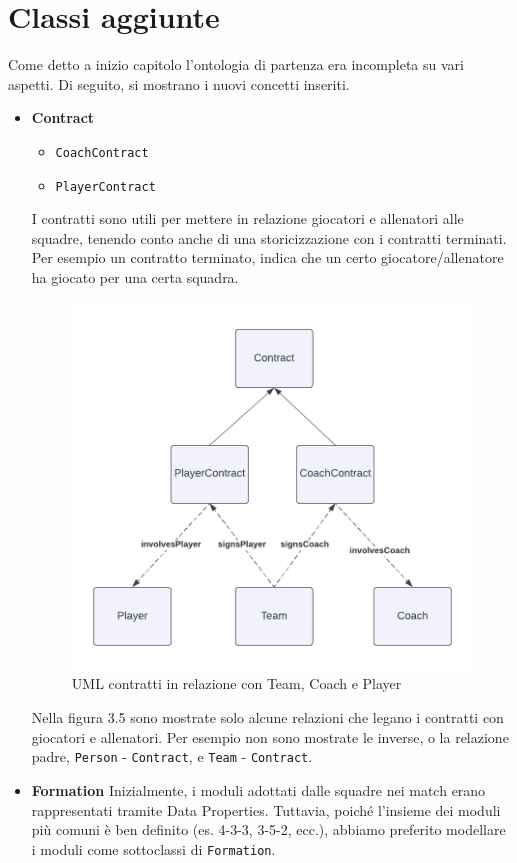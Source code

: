 \documentclass[11pt]{report} %
\begin{document}
\newpage


 \section{Classi aggiunte}

Come detto a inizio capitolo l'ontologia di partenza era incompleta su vari aspetti. Di seguito, si mostrano i nuovi concetti inseriti.

\begin{itemize}[leftmargin=*]
  \item \textbf{Contract}
  \begin{itemize}[leftmargin=2em]
    \item \texttt{CoachContract}
    \item \texttt{PlayerContract}
  \end{itemize}
  

  I contratti sono utili per mettere in relazione giocatori e allenatori alle squadre, tenendo conto anche di una storicizzazione con i contratti terminati. Per esempio un contratto terminato, indica che un certo giocatore/allenatore ha giocato per una certa squadra.
  
\begin{figure}[H]
    \centering
    \includegraphics[width=0.8\linewidth]{CONTRACT.png}
    \caption{UML contratti in relazione con Team, Coach e Player}
    \label{fig:enter-label}
\end{figure}

Nella figura 3.5 sono mostrate solo alcune relazioni che legano i contratti con giocatori e allenatori. Per esempio non sono mostrate le inverse, o la relazione padre,  \texttt{Person} - \texttt{Contract}, e \texttt{Team} - \texttt{Contract}. 
\newpage
  \item \textbf{Formation}
  Inizialmente, i moduli adottati dalle squadre nei match erano rappresentati tramite Data Properties. Tuttavia, poiché l’insieme dei moduli più comuni è ben definito (es. 4-3-3, 3-5-2, ecc.), abbiamo preferito modellare i moduli come sottoclassi di \texttt{Formation}.


\end{itemize}
\end{document}
